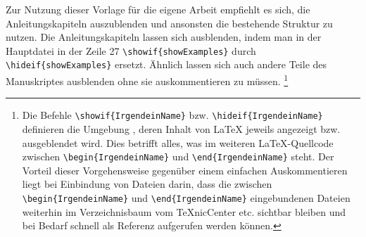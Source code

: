 \begin{showExamples}
Zur Nutzung dieser Vorlage für die eigene Arbeit empfiehlt es sich, die Anleitungskapiteln auszublenden und ansonsten die bestehende Struktur zu nutzen.
Die Anleitungskapiteln lassen sich ausblenden, indem man in der Hauptdatei
 in der Zeile 27
\verb+\showif{showExamples}+ durch \verb+\hideif{showExamples}+ ersetzt.
Ähnlich lassen sich auch andere Teile des Manuskriptes ausblenden ohne sie auskommentieren zu müssen.%
%
\footnote{Die Befehle \verb+\showif{IrgendeinName}+ bzw. \verb+\hideif{IrgendeinName}+ definieren die Umgebung ,
deren Inhalt von LaTeX{} jeweils angezeigt bzw. ausgeblendet wird.
Dies betrifft alles, was im weiteren \LaTeX-Quellcode zwischen \verb+\begin{IrgendeinName}+ und \verb+\end{IrgendeinName}+ steht.
Der Vorteil dieser Vorgehensweise gegenüber einem einfachen Auskommentieren liegt bei Einbindung von Dateien darin,
dass die zwischen \verb+\begin{IrgendeinName}+ und \verb+\end{IrgendeinName}+ eingebundenen Dateien
weiterhin im Verzeichnisbaum vom TeXnicCenter etc. sichtbar bleiben und bei Bedarf schnell als Referenz aufgerufen werden können.}
%














%
%
%
%
%
%
%
%
%
\end{showExamples}%